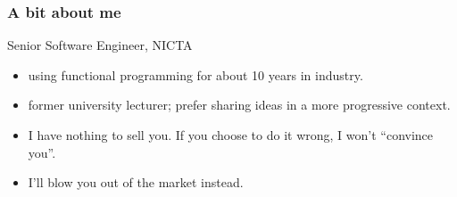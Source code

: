 \begin{frame}
\frametitle{A bit about me}
\begin{block}{Senior Software Engineer, NICTA}
\begin{itemize}
\item<1-> using functional programming for about 10 years in industry.
\item<2-> former university lecturer; prefer sharing ideas in a more progressive context.
\item<3-> I have nothing to sell you. If you choose to do it wrong, I won't ``convince you''. 
\item<4-> I'll blow you out of the market instead.
\end{itemize}
\end{block}
\end{frame}
